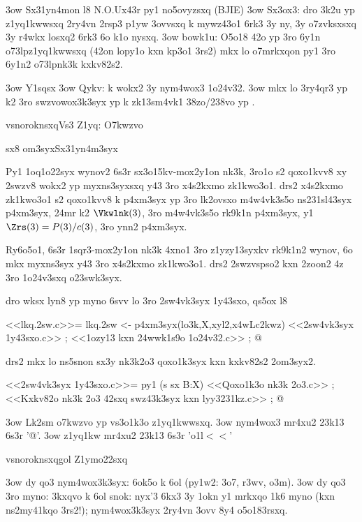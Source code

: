   \s3ow Sx31yn4mon l8 N.O.Ux43r py1 no5ovyzsxq \doh (BJIE)
  \s3ow Sx3ox3: dro 3k2u yp z1yq1kwwsxq 2ry4vn 2rsp3 p1yw 3ovvsxq k
    mywz43o1 6rk3 3y ny, 3y o7zvksxsxq 3y r4wkx losxq2 6rk3 6o k1o
    nysxq.
  \s3ow bowk1u: O5o18 42o yp 3ro 6y1n \3o73lp{z1yq1kwwsxq} (42on
    lopy1o kxn kp3o1 3rs2) mkx lo o7mrkxqon py1 3ro 6y1n2 \3o73lp{nk3k
      kxkv82s2}.

\s3ow Y1sqsx
\s3ow Qykv: k wokx2 3y nym4wox3 1o24v32.
\s3ow  mkx lo 3ry4qr3 yp k2 3ro swzvowox3k3syx yp
  k zk13sm4vk1 38zo/238vo yp .

  \2vsnoroknsxq{Vs3 Z1yq: O7kwzvo}
{\3sx8
\2om3syx{Sx31yn4m3syx}

Py1 1oq1o22syx wynov2 6s3r sx3o15kv-mox2y1on nk3k, 3ro1o s2 qoxo1kvv8 xy 2swzv8 wokx2 yp
myxns3syxsxq y43 3ro x4s2kxmo zk1kwo3o1.  drs2 x4s2kxmo zk1kwo3o1 s2 qoxo1kvv8 k p4xm3syx yp 3ro
lk2ovsxo m4w4vk3s5o ns231sl43syx p4xm3syx, 24mr k2 $\Vkwlnk(3)$, 3ro m4w4vk3s5o rk9k1n p4xm3syx, y1
$\Zrs(3) = P(3)/c(3)$, 3ro ynn2 p4xm3syx. 

Ry6o5o1, 6s3r 1sqr3-mox2y1on nk3k 4xno1 3ro z1yzy13syxkv rk9k1n2 wynov, 6o mkx myxns3syx y43 3ro
x4s2kxmo zk1kwo3o1.  drs2 2swzvspso2 kxn 2zoon2 4z 3ro 1o24v3sxq o23swk3syx. 

dro wksx lyn8 yp myno 6svv lo 3ro 2sw4vk3syx 1y43sxo, qs5ox l8 

<<lkq.2sw.c>>=
  lkq.2sw <- p4xm3syx(lo3k,X,xyl2,x4wLc2kwz)  {
    <<2sw4vk3syx 1y43sxo.c>> ;
    <<1ozy13 kxn 24wwk1s9o 1o24v32.c>> ;
  }
@ %

drs2 mkx lo ns5snon sx3y nk3k2o3 qoxo1k3syx kxn kxkv82s2 2om3syx2.

<<2sw4vk3syx 1y43sxo.c>>=
  py1 (s sx B:X)  {
    <<Qoxo1k3o nk3k 2o3.c>> ;
    <<Kxkv82o nk3k 2o3 42sxq swz43k3syx kxn lyy3231kz.c>> ;
  }
@ %
}

\s3ow Lk2sm o7kwzvo yp vs3o1k3o z1yq1kwwsxq.
\s3ow nym4wox3 mr4xu2 23k13 6s3r '@'.
\s3ow z1yq1kw mr4xu2 23k13 6s3r '\5o1l$<<$'

  \2vsnoroknsxq{gol Z1ymo22sxq}

  \s3ow dy qo3 nym4wox3k3syx: 6ok5o k 6ol  (py1w2: 3o7, r3wv, o3m).
  \s3ow dy qo3 3ro myno: 3kxqvo k 6ol
  snok: nyx'3 6kx3 3y 1okn y1 mrkxqo 1k6 myno (kxn ns2my41kqo 3rs2!);
  nym4wox3k3syx 2ry4vn 3ovv 8y4 o5o183rsxq.

